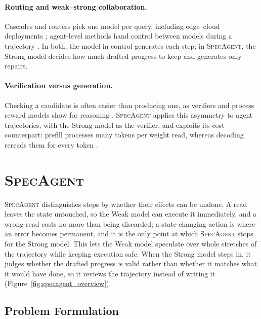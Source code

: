 \documentclass[11pt, copyright, logo, secondlogo]{template/lark}
\newcommand{\SpecAgent}{\textsc{SpecAgent}\xspace}
\begin{document}
\paragraph{Routing and weak--strong collaboration.}
Cascades and routers pick one model per query, including edge--cloud
deployments \citep{chen2023frugalgpt,aggarwal2024automix,ding2024hybridllm,ong2024routellm};
agent-level methods hand control between models during a trajectory
\citep{gao2026agentcollab,hemadri2026r2v,anon2026steplevelcua}. In both, the
model in control generates each step; in \SpecAgent{}, the Strong model
decides how much drafted progress to keep and generates only repairs.

\paragraph{Verification versus generation.}
Checking a candidate is often easier than producing one, as verifiers and
process reward models show for reasoning
\citep{cobbe2021training,lightman2024verify}. \SpecAgent{} applies this
asymmetry to agent trajectories, with the Strong model as the verifier, and
exploits its cost counterpart: prefill processes many tokens per weight read,
whereas decoding rereads them for every token
\citep{pope2023efficiently,kwon2023vllm,zheng2024sglang}.
\section{\SpecAgent{}}
\label{sec:method}

\SpecAgent{} distinguishes steps by whether their effects can be undone. A
read leaves the state untouched, so the Weak model can execute it immediately,
and a wrong read costs no more than being discarded; a state-changing action
is where an error becomes permanent, and it is the only point at which
\SpecAgent{} stops for the Strong model. This lets the Weak model speculate
over whole stretches of the trajectory while keeping execution safe. When the
Strong model steps in, it judges whether the drafted progress is valid rather
than whether it matches what it would have done, so it reviews the trajectory
instead of writing it (Figure~\ref{fig:specagent_overview}).

\subsection{Problem Formulation}
\label{sec:method_setting}
\end{document}
